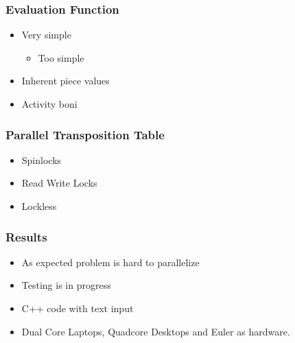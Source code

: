 \documentclass{beamer}
\begin{document}
\begin{frame}
\frametitle{Evaluation Function}
\begin{itemize}
\item Very simple
\begin{itemize}
\item Too simple
\end{itemize}
\item Inherent piece values
\item Activity boni
\end{itemize}
\end{frame}

\begin{frame}
\frametitle{Parallel Transposition Table}
\begin{itemize}
\item Spinlocks
\item Read Write Locks
\item Lockless
\end{itemize}
\end{frame}

\begin{frame}
\frametitle{Results}
\begin{itemize}
\item As expected problem is hard to parallelize
\item Testing is in progress
\item C++ code with text input
\item Dual Core Laptops, Quadcore Desktops and Euler as hardware.
\end{itemize}
\end{frame}

\end{document}
